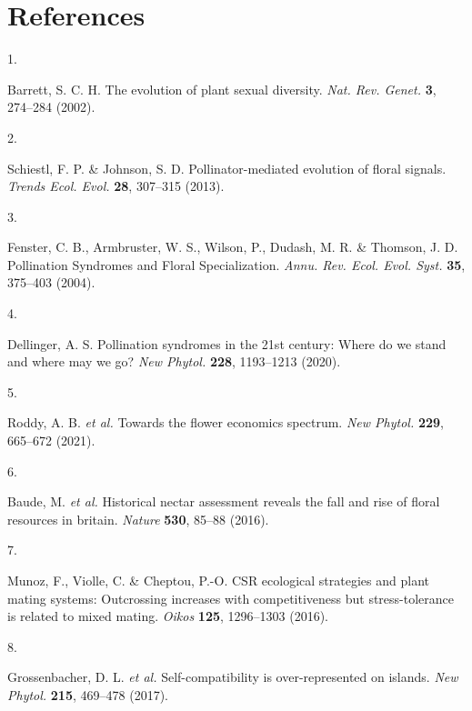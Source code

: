 \documentclass[
  12pt,
  a4paper,
]{article}
\newlength{\cslhangindent}
\newlength{\csllabelwidth}
\newlength{\cslentryspacingunit} %
\newenvironment{CSLReferences}[2] %
 {%
  \setlength{\parindent}{0pt}
  \ifodd #1
  \let\oldpar\par
  \def\par{\hangindent=\cslhangindent\oldpar}
  \fi
  \setlength{\parskip}{#2\cslentryspacingunit}
 }%
 {}
\newcommand{\CSLLeftMargin}[1]{\parbox[t]{\csllabelwidth}{#1}}
\newcommand{\CSLRightInline}[1]{\parbox[t]{\linewidth - \csllabelwidth}{#1}\break}
\begin{document}
\hypertarget{references}{%
\section{References}\label{references}}

\hypertarget{refs}{}
\begin{CSLReferences}{0}{0}
\leavevmode{}%
\CSLLeftMargin{1. }
\CSLRightInline{Barrett, S. C. H. The evolution of plant sexual diversity. \emph{Nat. Rev. Genet.} \textbf{3}, 274--284 (2002).}

\leavevmode{}%
\CSLLeftMargin{2. }
\CSLRightInline{Schiestl, F. P. \& Johnson, S. D. Pollinator-mediated evolution of floral signals. \emph{Trends Ecol. Evol.} \textbf{28}, 307--315 (2013).}

\leavevmode{}%
\CSLLeftMargin{3. }
\CSLRightInline{Fenster, C. B., Armbruster, W. S., Wilson, P., Dudash, M. R. \& Thomson, J. D. Pollination {Syndromes} and {Floral Specialization}. \emph{Annu. Rev. Ecol. Evol. Syst.} \textbf{35}, 375--403 (2004).}

\leavevmode{}%
\CSLLeftMargin{4. }
\CSLRightInline{Dellinger, A. S. Pollination syndromes in the 21st century: Where do we stand and where may we go? \emph{New Phytol.} \textbf{228}, 1193--1213 (2020).}

\leavevmode{}%
\CSLLeftMargin{5. }
\CSLRightInline{Roddy, A. B. \emph{et al.} Towards the flower economics spectrum. \emph{New Phytol.} \textbf{229}, 665--672 (2021).}

\leavevmode{}%
\CSLLeftMargin{6. }
\CSLRightInline{Baude, M. \emph{et al.} Historical nectar assessment reveals the fall and rise of floral resources in britain. \emph{Nature} \textbf{530}, 85--88 (2016).}

\leavevmode{}%
\CSLLeftMargin{7. }
\CSLRightInline{Munoz, F., Violle, C. \& Cheptou, P.-O. {CSR} ecological strategies and plant mating systems: Outcrossing increases with competitiveness but stress-tolerance is related to mixed mating. \emph{Oikos} \textbf{125}, 1296--1303 (2016).}

\leavevmode{}%
\CSLLeftMargin{8. }
\CSLRightInline{Grossenbacher, D. L. \emph{et al.} Self-compatibility is over-represented on islands. \emph{New Phytol.} \textbf{215}, 469--478 (2017).}


\end{CSLReferences}
\end{document}
